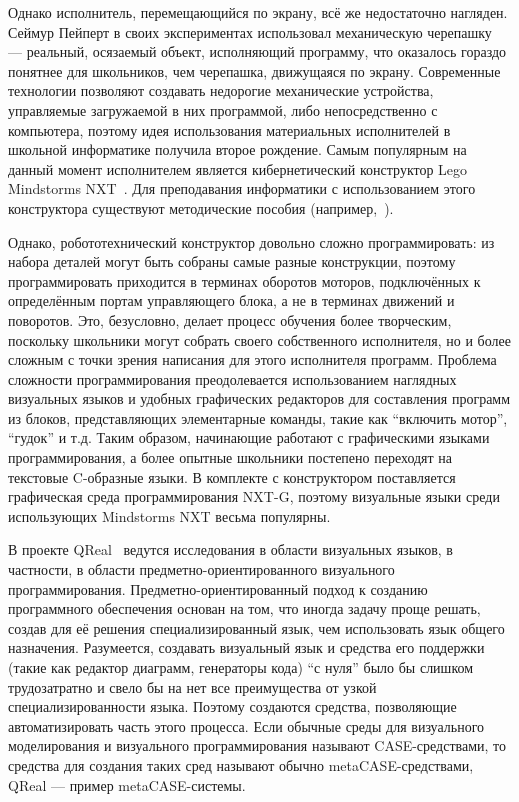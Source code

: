 \documentclass[a4paper]{article}
\begin{document}
Однако исполнитель, перемещающийся по экрану, всё же недостаточно нагляден. Сеймур Пейперт в своих экспериментах использовал механическую черепашку~\cite{logoTurtle} --- реальный, осязаемый объект, исполняющий программу, что оказалось гораздо понятнее для школьников, чем черепашка, движущаяся по экрану. Современные технологии позволяют создавать недорогие механические устройства, управляемые загружаемой в них программой, либо непосредственно с компьютера, поэтому идея использования материальных исполнителей в школьной информатике получила второе рождение. Самым популярным на данный момент исполнителем является кибернетический конструктор Lego Mindstorms NXT~\cite{legoNxt}. Для преподавания информатики с использованием этого конструктора существуют методические пособия (например,~\cite{filippov}). 

Однако, робототехнический конструктор довольно сложно программировать: из набора деталей могут быть собраны самые разные конструкции, поэтому программировать приходится в терминах оборотов моторов, подключённых к определённым портам управляющего блока, а не в терминах движений и поворотов. Это, безусловно, делает процесс обучения более творческим, поскольку школьники могут собрать своего собственного исполнителя, но и более сложным с точки зрения написания для этого исполнителя программ. Проблема сложности программирования преодолевается использованием наглядных визуальных языков и удобных графических редакторов для составления программ из блоков, представляющих элементарные команды, такие как ``включить мотор'', ``гудок'' и т.д. Таким образом, начинающие работают с графическими языками программирования, а более опытные школьники постепено переходят на текстовые C-образные языки. В комплекте с конструктором поставляется графическая среда программирования NXT-G, поэтому визуальные языки среди использующих Mindstorms NXT весьма популярны.

В проекте QReal~\cite{qReal} ведутся исследования в области визуальных языков, в частности, в области предметно-ориентированного визуального программирования. Предметно-ориентированный подход к созданию программного обеспечения основан на том, что иногда задачу проще решать, создав для её решения специализированный язык, чем использовать язык общего назначения. Разумеется, создавать визуальный язык и средства его поддержки (такие как редактор диаграмм, генераторы кода) ``с нуля'' было бы слишком трудозатратно и свело бы на нет все преимущества от узкой специализированности языка. Поэтому создаются средства, позволяющие автоматизировать часть этого процесса. Если обычные среды для визуального моделирования и визуального программирования называют CASE-средствами, то средства для создания таких сред называют обычно metaCASE-средствами, QReal --- пример metaCASE-системы.
\end{document}
